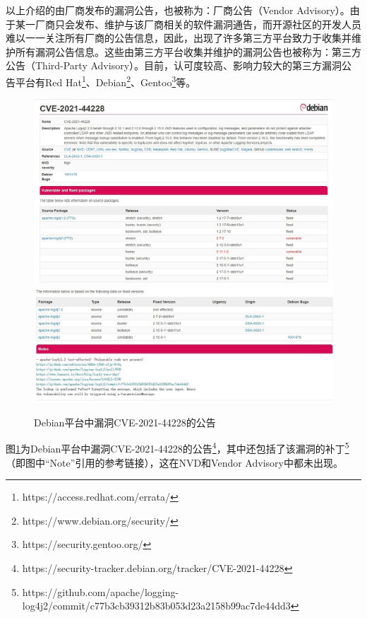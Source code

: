 以上介绍的由厂商发布的漏洞公告，也被称为：厂商公告（Vendor Advisory）。由于某一厂商只会发布、维护与该厂商相关的软件漏洞通告，而开源社区的开发人员难以一一关注所有厂商的公告信息，因此，出现了许多第三方平台致力于收集并维护所有漏洞公告信息。这些由第三方平台收集并维护的漏洞公告也被称为：第三方公告（Third-Party Advisory）。目前，认可度较高、影响力较大的第三方漏洞公告平台有Red Hat\footnote{https://access.redhat.com/errata/}、Debian\footnote{https://www.debian.org/security/}、Gentoo\footnote{https://security.gentoo.org/}等。



\begin{figure}[!t]
    \centering
    \includegraphics[width=1.0\textwidth]{fig/debian-2021-44228}
    \includegraphics[width=1.0\textwidth]{fig/debian-2021-44228-2}
    \caption{Debian平台中漏洞CVE-2021-44228的公告}
    \label{fig:debian-2021-44228}
\end{figure}
图\ref{fig:debian-2021-44228}为Debian平台中漏洞CVE-2021-44228的公告\footnote{https://security-tracker.debian.org/tracker/CVE-2021-44228}，其中还包括了该漏洞的补丁\footnote{https://github.com/apache/logging-log4j2/commit/c77b3cb39312b83b053d23a2158b99ac7de44dd3}（即图中“Note”引用的参考链接），这在NVD和Vendor Advisory中都未出现。


